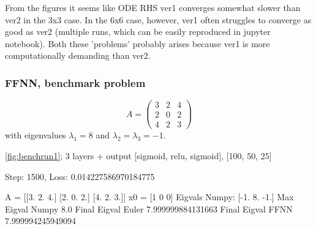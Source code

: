 From the figures it seems like ODE RHS ver1 converges somewhat slower than ver2 in the 3x3 case. In the 6x6 case, however, ver1 often struggles to converge as good as ver2 (multiple runs, which can be easily reproduced in jupyter notebook). Both these 'problems' probably arises because ver1 is more computationally demanding than ver2.

\subsubsection{FFNN, benchmark problem}

\begin{equation*}
    A = \left(\begin{array}{ccc}
        3 & 2 & 4  \\
        2 & 0 & 2  \\
        4 & 2 & 3
    \end{array}\right)
\end{equation*}
with eigenvalues $\lambda_1 = 8$ and $\lambda_2 = \lambda_3 = -1$.



\autoref{fig:benchrun1}; 3 layers + output [sigmoid, relu, sigmoid], [100, 50, 25]

Step: 1500, Loss: 0.014227586970184775

A = [[3. 2. 4.]
 [2. 0. 2.]
 [4. 2. 3.]]
x0 = [1 0 0]
Eigvals Numpy: [-1.  8. -1.]
Max Eigval Numpy 8.0
Final Eigval Euler 7.999999884131663
Final Eigval FFNN 7.999994245949094

